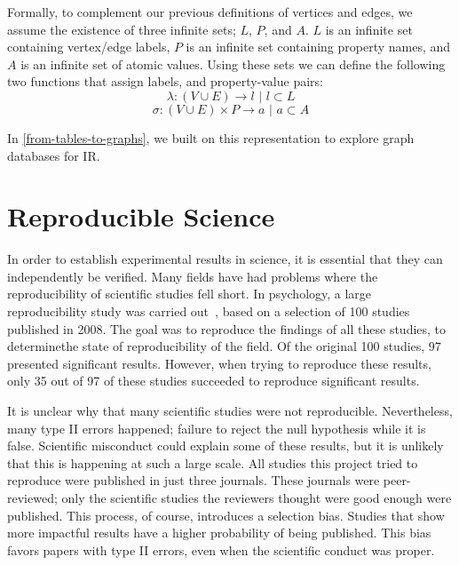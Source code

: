 Formally, to complement our previous definitions of vertices and edges, we assume the existence of three infinite sets; $L$, $P$, and $A$. $L$ is an infinite set containing vertex/edge labels, $P$ is an infinite set containing property names, and $A$ is an infinite set of atomic values. Using these sets we can define the following two functions that assign labels, and property-value pairs:
\begin{equation}
	\lambda : \left(V \cup E\right) \rightarrow l \text{ | } l \subset L
\end{equation}
\begin{equation}
	\sigma : \left(V \cup E\right) \times P \rightarrow a \text{ | } a \subset A
\end{equation}

In \cref{from-tables-to-graphs}, we built on this representation to explore graph databases for IR. 

\section{Reproducible Science}
In order to establish experimental results in science, it is essential that they can independently be verified. Many fields have had problems where the reproducibility of scientific studies fell short. In psychology, a large reproducibility study was carried out~\citep{psychology-reproduciblity}, based on a selection of 100 studies published in 2008. The goal was to reproduce the findings of all these studies, to determinethe state of reproducibility of the field. Of the original 100 studies, 97 presented significant results. However, when trying to reproduce these results, only 35 out of 97 of these studies succeeded to reproduce significant results. 

It is unclear why that many scientific studies were not reproducible. Nevertheless, many type II errors happened; failure to reject the null hypothesis while it is false. Scientific misconduct could explain some of these results, but it is unlikely that this is happening at such a large scale. All studies this project tried to reproduce were published in just three journals. These journals were peer-reviewed; only the scientific studies the reviewers thought were good enough were published. This process, of course, introduces a selection bias. Studies that show more impactful results have a higher probability of being published. This bias favors papers with type II errors, even when the scientific conduct was proper. 

